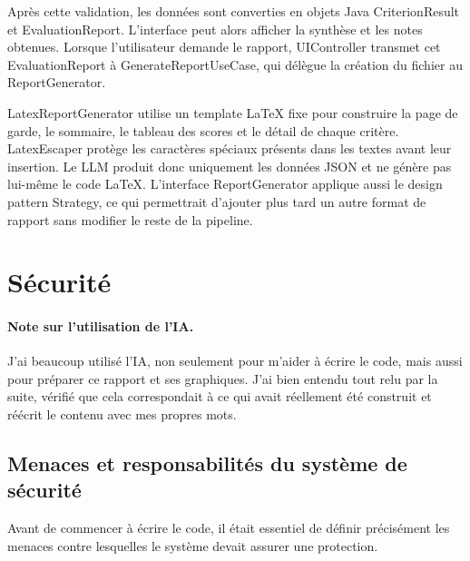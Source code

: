 \documentclass[11pt,a4paper]{article}
\begin{document}
Après cette validation, les données sont converties en objets Java CriterionResult et EvaluationReport. L’interface peut alors afficher la synthèse et les notes obtenues. Lorsque l’utilisateur demande le rapport, UIController transmet cet EvaluationReport à GenerateReportUseCase, qui délègue la création du fichier au ReportGenerator.

LatexReportGenerator utilise un template LaTeX fixe pour construire la page de garde, le sommaire, le tableau des scores et le détail de chaque critère. LatexEscaper protège les caractères spéciaux présents dans les textes avant leur insertion. Le LLM produit donc uniquement les données JSON et ne génère pas lui-même le code LaTeX. L’interface ReportGenerator applique aussi le design pattern Strategy, ce qui permettrait d’ajouter plus tard un autre format de rapport sans modifier le reste de la pipeline.

\section{Sécurité}
\begingroup
\let\section\subsection
\let\subsection\subsubsection
\paragraph{Note sur l'utilisation de l'IA.} J'ai beaucoup utilisé l'IA, non seulement pour m'aider à écrire le code, mais aussi pour préparer ce rapport et ses graphiques. J'ai bien entendu tout relu par la suite, vérifié que cela correspondait à ce qui avait réellement été construit et réécrit le contenu avec mes propres mots.

\section{Menaces et responsabilités du système de sécurité}
Avant de commencer à écrire le code, il était essentiel de définir précisément les menaces contre lesquelles le système devait assurer une protection.
\end{document}
